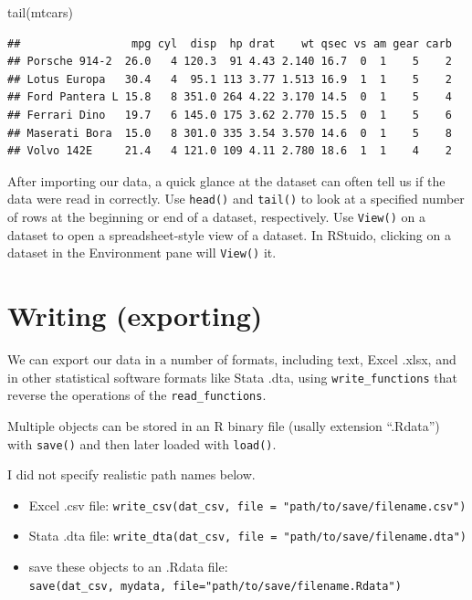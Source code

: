 \documentclass[
]{book}
\newenvironment{Shaded}{\begin{snugshade}}{\end{snugshade}}
\newcommand{\FunctionTok}[1]{\textcolor[rgb]{0.00,0.00,0.00}{#1}}
\newcommand{\NormalTok}[1]{#1}
\providecommand{\tightlist}{%
  \setlength{\itemsep}{0pt}\setlength{\parskip}{0pt}}
\begin{document}
\begin{Shaded}
\begin{Highlighting}[]
\FunctionTok{tail}\NormalTok{(mtcars)}
\end{Highlighting}
\end{Shaded}

\begin{verbatim}
##                 mpg cyl  disp  hp drat    wt qsec vs am gear carb
## Porsche 914-2  26.0   4 120.3  91 4.43 2.140 16.7  0  1    5    2
## Lotus Europa   30.4   4  95.1 113 3.77 1.513 16.9  1  1    5    2
## Ford Pantera L 15.8   8 351.0 264 4.22 3.170 14.5  0  1    5    4
## Ferrari Dino   19.7   6 145.0 175 3.62 2.770 15.5  0  1    5    6
## Maserati Bora  15.0   8 301.0 335 3.54 3.570 14.6  0  1    5    8
## Volvo 142E     21.4   4 121.0 109 4.11 2.780 18.6  1  1    4    2
\end{verbatim}

After importing our data, a quick glance at the dataset can often tell us if the data were read in correctly. Use \texttt{head()} and \texttt{tail()} to look at a specified number of rows at the beginning or end of a dataset, respectively. Use \texttt{View()} on a dataset to open a spreadsheet-style view of a dataset. In RStuido, clicking on a dataset in the Environment pane will \texttt{View()} it.

\hypertarget{writing-exporting}{%
\section{Writing (exporting)}\label{writing-exporting}}

We can export our data in a number of formats, including text, Excel .xlsx, and in other statistical software formats like Stata .dta, using \texttt{write\_functions} that reverse the operations of the \texttt{read\_functions}.

Multiple objects can be stored in an R binary file (usally extension ``.Rdata'') with \texttt{save()} and then later loaded with \texttt{load()}.

I did not specify realistic path names below.

\begin{itemize}
\tightlist
\item
  Excel .csv file: \texttt{write\_csv(dat\_csv,\ file\ =\ "path/to/save/filename.csv")}
\item
  Stata .dta file: \texttt{write\_dta(dat\_csv,\ file\ =\ "path/to/save/filename.dta")}
\item
  save these objects to an .Rdata file: \texttt{save(dat\_csv,\ mydata,\ file="path/to/save/filename.Rdata")}
\end{itemize}
\end{document}
